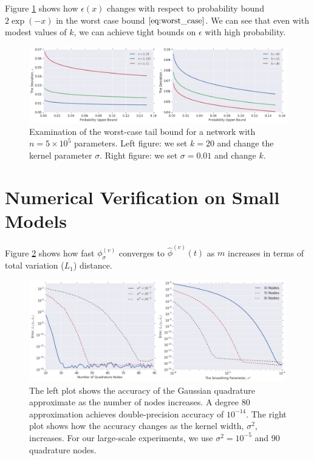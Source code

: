 \documentclass{article}
\newcommand{\phis}{\phi_{\sigma}}
\newcommand{\phisv}{\phis^{(v)}}
\begin{document}
Figure \ref{fig:tail_bound} shows how $\epsilon(x)$ changes with respect to probability bound $2 \exp(-x)$ in the worst case bound $\eqref{eq:worst_case}$. We can see that even with modest values of $k$, we can achieve tight bounds on $\epsilon$ with high probability. 

\begin{figure} 
\includegraphics[width=\textwidth]{Deviation_Bound.png}
\caption{Examination of the worst-case tail bound for a network with $n = 5\times 10^5$ parameters. Left figure: we set $k=20$ and change the kernel parameter $\sigma$. Right figure: we set $\sigma =0.01$ and change $k$.\label{fig:tail_bound}}
\end{figure}

\section{Numerical Verification on Small Models}
\label{app:verify}
Figure \ref{fig:nodes} shows how fast $\phisv$ converges to $\widehat{\phi}^{(v)}(t)$ as $m$ increases in terms of total variation ($L_1$) distance. 

\begin{figure}[h]
\includegraphics[width=\textwidth]{Number_Of_Nodes.png}
\vspace{-0.5cm}
\caption{The left plot shows the accuracy of the Gaussian quadrature approximate as the number of nodes increases. A degree $80$ approximation achieves double-precision accuracy of $10^{-14}$. The right plot shows how the accuracy changes as the kernel width, $\sigma^2$, increases. For our large-scale experiments, we use $\sigma^2 = 10^{-5}$ and $90$ quadrature nodes. \label{fig:nodes}}
\end{figure}
\end{document}
